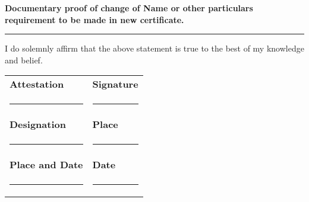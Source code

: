\documentclass{article}
\begin{document}
\vspace{0.5cm}

\textbf{Documentary proof of change of Name or other particulars requirement to be made in new certificate.} \hspace{0.5cm} \rule{5cm}{0.4pt}

\vspace{0.5cm}

I do solemnly affirm that the above statement is true to the best of my knowledge and belief.

\vspace{0.5cm}

\begin{tabular}{ll}
\textbf{Attestation} & \textbf{Signature} \\
\rule{5cm}{0.4pt} & \rule{5cm}{0.4pt} \\
\textbf{Designation} & \textbf{Place} \\
\rule{5cm}{0.4pt} & \rule{5cm}{0.4pt} \\
\textbf{Place and Date} & \textbf{Date} \\
\rule{5cm}{0.4pt} & \rule{5cm}{0.4pt} \\
\end{tabular}
\end{document}
